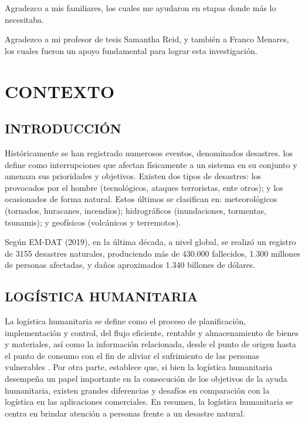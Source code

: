 \documentclass[12pt,a4paper]{article}
\begin{document}
Agradezco a mis familiares, los cuales me ayudaron en etapas donde más lo necesitaba. 

Agradezco a mi profesor de tesis Samantha Reid, y también a Franco Menares, los cuales fueron un apoyo fundamental para lograr esta investigación.

\pagebreak			%

\tableofcontents	%

\pagebreak

\listoftables		 %

\listoffigures		%

\pagebreak

\section{CONTEXTO}

\subsection{INTRODUCCIÓN}

Históricamente se han registrado numerosos eventos, denominados desastres. \citet{van2006humanitarian} los define como interrupciones que afectan físicamente a un sistema en su conjunto y amenaza sus prioridades y objetivos. Existen dos tipos de desastres: los provocados por el hombre (tecnológicos, ataques terroristas, ente otros); y los ocasionados de forma natural. Estos últimos se clasifican en: meteorológicos (tornados, huracanes, incendios); hidrográficos (inundaciones, tormentas, tsunamis); y geofísicos (volcánicos y terremotos).

Según EM-DAT (2019), en la última década, a nivel global, se realizó un registro de 3155 desastres naturales, produciendo más de 430.000 fallecidos, 1.300 millones de personas afectadas, y daños aproximados 1.340 billones de dólares.

\subsection{LOGÍSTICA HUMANITARIA}
La logística humanitaria se define como el proceso de planificación, implementación y control, del flujo eficiente, rentable y almacenamiento de bienes y materiales, así como la información relacionada, desde el punto de origen hasta el punto de consumo con el fin de aliviar el sufrimiento de las personas vulnerables \citep{supply}. Por otra parte, \citet{celik} establece que, si bien la logística humanitaria desempeña un papel importante en la consecución de los objetivos de la ayuda humanitaria, existen grandes diferencias y desafíos en comparación con la logística en las aplicaciones comerciales. En resumen, la logística humanitaria se centra en brindar atención a personas frente a un desastre natural.
\end{document}
